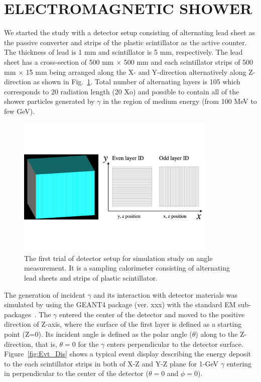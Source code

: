 \documentclass[jkps,preprint,fleqn,showpacs,showkeys]{revtex4}
\begin{document}
\section{ELECTROMAGNETIC SHOWER}
\label{sec:ems}
We started the study with a detector setup consisting of alternating lead sheet as the passive converter and strips of the plastic scintillator as the active counter. The thickness of lead is 1 mm and scintillator is 5 mm, respectively. The lead sheet has a cross-section of  500 mm $\times$ 500 mm and each scintillator strips of 500 mm $\times$ 15 mm  being arranged along the X- and Y-direction alternatively along Z-direction as shown in  Fig.~\ref{fig:det_conf}. Total number of alternating layers is 105 which corresponds to 20 radiation length (20 Xo) and possible to contain all of the shower particles generated by $\gamma$ in the region of medium energy (from  100 MeV to few GeV). 
 
\begin{figure}[!hbt]
\includegraphics[width=0.85\textwidth]{figures/Sec2/Prototype_samplingcal.pdf}

\caption{ The first trial of detector setup for simulation study on angle measurement. It is a sampling calorimeter consisting of alternating lead sheets and strips of plastic scintillator. }
\label{fig:det_conf}
\end{figure}

The generation of incident $\gamma$ and its interaction with detector materials was simulated by using the GEANT4 package (ver. xxx) with the standard EM sub-packages~\cite{GEANT4}.
The $\gamma$ entered the center of the detector and moved to the positive direction of Z-axis, where the surface of the first layer is defined as a starting point (Z=0). Its incident angle is defined as the polar angle ($\theta$) along to the Z-direction, that is, $\theta = 0$ for the $\gamma$ enters perpendicular to the detector surface. %
Figure~\ref{fig:Evt_Dis} shows a typical event display describing the energy deposit to the each scintillator strips in both of X-Z and Y-Z plane for 1-GeV $\gamma$ entering in perpendicular to the center of the detector ($\theta=0$ and $\phi=0$).
\end{document}
